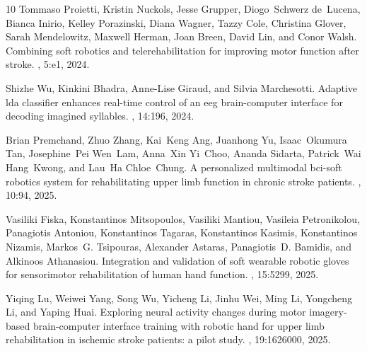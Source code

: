 \documentclass[a4paper,11pt]{article}
\begin{document}
\begin{thebibliography}{10}
Tommaso Proietti, Kristin Nuckols, Jesse Grupper, Diogo~Schwerz de~Lucena,
  Bianca Inirio, Kelley Porazinski, Diana Wagner, Tazzy Cole, Christina Glover,
  Sarah Mendelowitz, Maxwell Herman, Joan Breen, David Lin, and Conor Walsh.
\newblock Combining soft robotics and telerehabilitation for improving motor
  function after stroke.
, 5:e1, 2024.

Shizhe Wu, Kinkini Bhadra, Anne-Lise Giraud, and Silvia Marchesotti.
\newblock Adaptive lda classifier enhances real-time control of an eeg
  brain-computer interface for decoding imagined syllables.
, 14:196, 2024.

Brian Premchand, Zhuo Zhang, Kai~Keng Ang, Juanhong Yu, Isaac~Okumura Tan,
  Josephine~Pei Wen~Lam, Anna~Xin Yi~Choo, Ananda Sidarta,
  Patrick~Wai Hang~Kwong, and Lau~Ha Chloe~Chung.
\newblock A personalized multimodal bci-soft robotics system for rehabilitating
  upper limb function in chronic stroke patients.
, 10:94, 2025.

Vasiliki Fiska, Konstantinos Mitsopoulos, Vasiliki Mantiou, Vasileia
  Petronikolou, Panagiotis Antoniou, Konstantinos Tagaras, Konstantinos
  Kasimis, Konstantinos Nizamis, Markos~G. Tsipouras, Alexander Astaras,
  Panagiotis~D. Bamidis, and Alkinoos Athanasiou.
\newblock Integration and validation of soft wearable robotic gloves for
  sensorimotor rehabilitation of human hand function.
, 15:5299, 2025.

Yiqing Lu, Weiwei Yang, Song Wu, Yicheng Li, Jinhu Wei, Ming Li, Yongcheng Li,
  and Yaping Huai.
\newblock Exploring neural activity changes during motor imagery-based
  brain-computer interface training with robotic hand for upper limb
  rehabilitation in ischemic stroke patients: a pilot study.
, 19:1626000, 2025.

\end{thebibliography}
\end{document}
